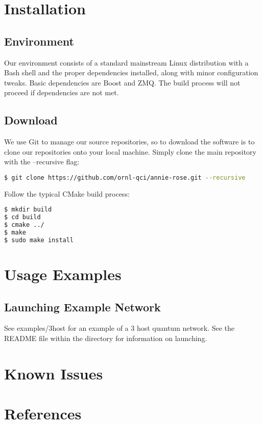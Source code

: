 \documentclass[letterpaper,twoside=false]{scrbook}
\begin{document}
\chapter{Installation}
	\section{Environment}
		Our environment consists of a standard mainstream Linux distribution with a Bash shell and the proper dependencies installed, along with minor configuration tweaks. Basic dependencies are Boost and ZMQ. The build process will not proceed if dependencies are not met.
    
	\section{Download}
 		We use Git to manage our source repositories, so to download the software is to clone our repositories onto your local machine. Simply clone the main repository with the --recursive flag:
 		
 		\begin{lstlisting}[language=bash]
$ git clone https://github.com/ornl-qci/annie-rose.git --recursive
 		\end{lstlisting}
 		
 		Follow the typical CMake build process:
 		
 		\begin{lstlisting}[language=bash]
$ mkdir build
$ cd build
$ cmake ../
$ make
$ sudo make install
 		\end{lstlisting}
\chapter{Usage Examples}
 	\section{Launching Example Network}
 		See examples/3host for an example of a 3 host quantum network. See the README file within the directory for information on launching.
\chapter{Known Issues}
\chapter{References}
\end{document}
